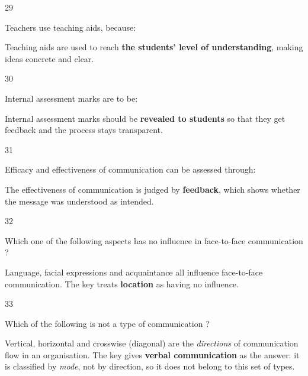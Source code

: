 \begin{question}{29}
{Teachers use teaching aids, because:\par}
\begin{explain}
Teaching aids are used to reach \textbf{the students' level of understanding}, making ideas concrete and clear.
\end{explain}
\end{question}

\begin{question}{30}
{Internal assessment marks are to be:\par}
\begin{explain}
Internal assessment marks should be \textbf{revealed to students} so that they get feedback and the process stays transparent.
\end{explain}
\end{question}

\begin{question}{31}
{Efficacy and effectiveness of communication can be assessed through:\par}
\begin{explain}
The effectiveness of communication is judged by \textbf{feedback}, which shows whether the message was understood as intended.
\end{explain}
\end{question}

\begin{question}{32}
{Which one of the following aspects has no influence in face-to-face communication ?\par}
\begin{explain}
Language, facial expressions and acquaintance all influence face-to-face communication. The key treats \textbf{location} as having no influence.
\end{explain}
\end{question}

\begin{question}{33}
{Which of the following is not a type of communication ?\par}
\begin{explain}
Vertical, horizontal and crosswise (diagonal) are the \emph{directions} of communication flow in an organisation. The key gives \textbf{verbal communication} as the answer: it is classified by \emph{mode}, not by direction, so it does not belong to this set of types.
\end{explain}
\end{question}

